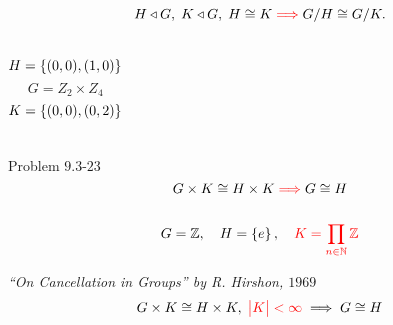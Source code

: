 
\begin{frame}

  \begin{center}
	\large{\it {}}
  \end{center}
\end{frame}

\begin{frame}
  \begin{exampleblock}{}
    \[
      H \triangleleft G,\; K \triangleleft G,\; H \cong K \textcolor{red}{\implies} G/H \cong G/K.
    \]
  \end{exampleblock}

  \pause
  \vspace{0.50cm}

  \pause
  \vspace{-0.50cm}
  \begin{columns}
	  \[
		H = \left\{(0,0), (1,0)\right\}
	  \]
	  \uncover<4->{
		\[
		  G/H \cong \z_{4}
		\]
	  }
	  \vspace{-0.40cm}
	  \[
		G = Z_2 \times Z_4
	  \]
	  \[
		K = \left\{(0,0), (0,2)\right\}
	  \]
	  \uncover<5->{
		\[
		  G/K \cong K_{4}
		\]
	  }
  \end{columns}

  \vspace{0.50cm}
\end{frame}

\begin{frame}
  \begin{exampleblock}{Problem $9.3$-$23$}
	\[
	  G \times K \cong H \times K \textcolor{red}{\implies} G \cong H
	\]
  \end{exampleblock}

  \begin{columns}
	  \pause
	  \pause
  \end{columns}

  \pause
  \vspace{0.60cm}
  \[
	G = \mathbb{Z},\quad H = \left\{e\right\},\quad \textcolor{red}{K = \prod_{n \in \mathbb{N}} \mathbb{Z}}
  \]

  \pause
  \begin{alertblock}{\it ``On Cancellation in Groups'' by R. Hirshon, $1969$}
	\[
	  G \times K \cong H \times K,\; \textcolor{red}{\big\lvert K \big\rvert < \infty} \implies G \cong H
	\]
  \end{alertblock}
\end{frame}

